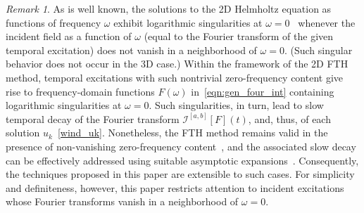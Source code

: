 \documentclass[11pt]{article}
\theoremstyle{plain}
\theoremstyle{remark}
\newtheorem{remark}{Remark}
\begin{document}
\begin{remark}\label{rmk:zer_freq} 
  As is well known, the solutions to the 2D Helmholtz equation as
  functions of frequency $\omega$ exhibit logarithmic singularities at
  $\omega = 0$~\cite{maccamy1965low, werner1986low} whenever the
  incident field as a function of $\omega$ (equal to the Fourier
  transform of the given temporal excitation) does not vanish in a
  neighborhood of $\omega = 0$. (Such singular behavior does not occur
  in the 3D case.) Within the framework of the 2D FTH method, temporal
  excitations with such nontrivial zero-frequency content give rise to
  frequency-domain functions $F(\omega)$ in~\eqref{eqn:gen_four_int}
  containing logarithmic singularities at $\omega = 0$. Such
  singularities, in turn, lead to slow temporal decay of the Fourier
  transform $\mathcal{I}^{[a,b]}[F](t)$, and, thus, of each solution
  $u_k$~\eqref{wind_uk}. Nonetheless, the FTH method remains valid in
  the presence of non-vanishing zero-frequency content~\cite{abl}, and
  the associated slow decay can be effectively addressed using
  suitable asymptotic expansions~\cite{ablII}. Consequently, the
  techniques proposed in this paper are extensible to such cases. For
  simplicity and definiteness, however, this paper restricts attention
  to incident excitations whose Fourier transforms vanish in a
  neighborhood of $\omega = 0$.
\end{remark}
\end{document}
